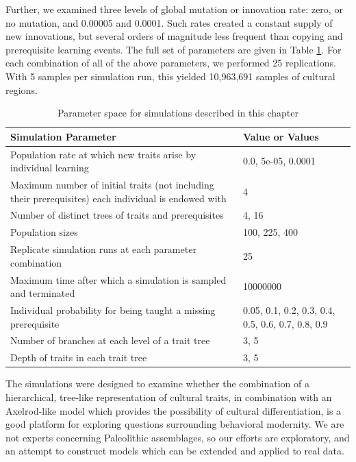 \documentclass[referee,graybox,natbib]{svmult}
\begin{document}
Further, we examined three levels of global mutation or innovation rate:
zero, or no mutation, and 0.00005 and 0.0001. Such rates created a
constant supply of new innovations, but several orders of magnitude less
frequent than copying and prerequisite learning events. The full set of
parameters are given in Table \ref{tab:axelrodct-sim-parameters}. For
each combination of all of the above parameters, we performed 25
replications. With 5 samples per simulation run, this yielded 10,963,691
samples of cultural regions.

\begin{table}[H]
\begin{tabular}{|p{}|p{}|}
\hline
\textbf{Simulation Parameter} & \textbf{Value or Values} \\ 
\hline
Population rate at which new traits arise by individual learning & 0.0, 5e-05, 0.0001\\ 
 \hline 
Maximum number of initial traits (not including their prerequisites) each individual is endowed with & 4\\ 
 \hline 
Number of distinct trees of traits and prerequisites & 4, 16\\ 
 \hline 
Population sizes & 100, 225, 400\\ 
 \hline 
Replicate simulation runs at each parameter combination & 25\\ 
 \hline 
Maximum time after which a simulation is sampled and terminated & 10000000\\ 
 \hline 
Individual probability for being taught a missing prerequisite & 0.05, 0.1, 0.2, 0.3, 0.4, 0.5, 0.6, 0.7, 0.8, 0.9\\ 
 \hline 
Number of branches at each level of a trait tree & 3, 5\\ 
 \hline 
Depth of traits in each trait tree & 3, 5\\ 
 \hline 
\hline
\end{tabular}
\caption{Parameter space for simulations described in this chapter}
\label{tab:axelrodct-sim-parameters}
\end{table}

The simulations were designed to examine whether the combination of a
hierarchical, tree-like representation of cultural traits, in
combination with an Axelrod-like model which provides the possibility of
cultural differentiation, is a good platform for exploring questions
surrounding behavioral modernity. We are not experts concerning
Paleolithic assemblages, so our efforts are exploratory, and an attempt
to construct models which can be extended and applied to real data.
\end{document}
